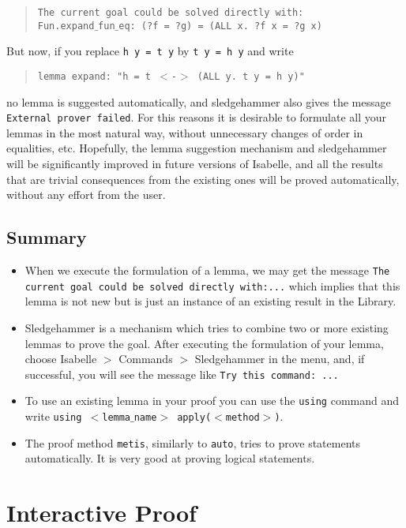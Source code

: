 \documentclass[11pt]{article}
\newcommand{\prog}[1]{\par\noindent\begin{quote}#1\end{quote}\par\noindent}
\begin{document}
\prog{\tt The current goal could be solved directly with:\\
    Fun.expand$\_$fun$\_$eq: (?f = ?g) = (ALL x. ?f x = ?g x)}%

But now, if you replace {\tt h y = t y} by {\tt t y = h y} and write

\prog{\tt lemma expand: "h = t $<$-$>$ (ALL y. t y = h y)"}%
no lemma is suggested automatically, and sledgehammer also gives the message {\tt External prover failed}. For this reasons it is desirable to formulate all your lemmas in the most natural way, without unnecessary changes of order in equalities, etc. Hopefully, the lemma suggestion mechanism and sledgehammer will be significantly improved in future versions of Isabelle, and all the results that are trivial consequences from the existing ones will be proved automatically, without any effort from the user.

\subsection{Summary}

\begin{itemize}

    \item When we execute the formulation of a lemma, we may get the message {\tt The current goal could be solved directly with:...} which implies that this lemma is not new but is just an instance of an existing result in the Library.

    \item  Sledgehammer is a mechanism which tries to combine two or more existing lemmas to prove the goal. After executing the formulation of your lemma, choose Isabelle $>$ Commands $>$ Sledgehammer in the menu, and, if successful, you will see the message like {\tt Try this command: ...}

    \item  To use an existing lemma in your proof you can use the {\tt using} command and write {\tt using $<$lemma$\_$name$>$ apply($<$method$>$)}.

    \item The proof method {\tt metis}, similarly to {\tt auto}, tries to prove statements automatically. It is very good at proving logical statements.

\end{itemize}


\section{Interactive Proof}
\end{document}

